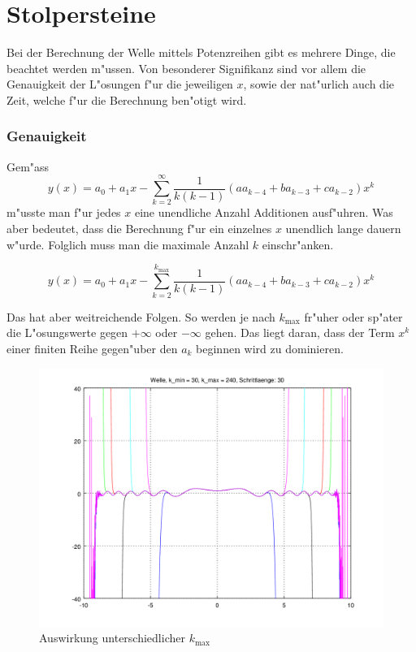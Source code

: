 \section{Stolpersteine}

Bei der Berechnung der Welle mittels Potenzreihen gibt es mehrere Dinge, die 
beachtet werden m"ussen. Von besonderer Signifikanz sind vor allem die 
Genauigkeit der L"osungen f"ur die jeweiligen $x$, sowie der nat"urlich auch 
die Zeit, welche f"ur die Berechnung ben"otigt wird.


\subsubsection{Genauigkeit}
Gem"ass
\begin{equation*}
	y(x) = a_0 + a_1x 
	-\sum_{k=2}^{\infty}\frac{1}{k(k-1)}(aa_{k-4}+ba_{k-3}+ca_{k-2})x^k
\end{equation*}
m"usste man f"ur jedes $x$ eine unendliche Anzahl Additionen ausf"uhren. Was 
aber bedeutet, dass die Berechnung f"ur ein einzelnes $x$ unendlich lange 
dauern w"urde. Folglich muss man die maximale Anzahl $k$ einschr"anken.

\begin{equation*}
	y(x) = a_0 + a_1x 
	-\sum_{k=2}^{k_{\text{max}}}\frac{1}{k(k-1)}(aa_{k-4}+ba_{k-3}+ca_{k-2})x^k
\end{equation*}

Das hat aber weitreichende Folgen. So werden je nach $k_{\text{max}}$ fr"uher 
oder sp"ater die L"osungswerte gegen $+\infty$ oder $-\infty$ gehen. Das liegt 
daran, dass der Term $x^k$ einer finiten Reihe gegen"uber den $a_k$ beginnen 
wird zu dominieren.

\begin{figure}
	\includegraphics[scale=0.65]{./wellen/images/kmax/krangewaveeven.png}
	\caption{Auswirkung unterschiedlicher $k_{\text{max}}$}
	\label{fig:wellen:variablekmax}
\end{figure}

